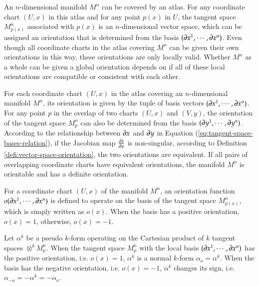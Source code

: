 \documentclass[11pt, a4paper]{book}
\begin{document}
An $n$-dimensional manifold $M^n$ can be covered by an atlas. For any coordinate chart
$(U,x)$ in this atlas and for any point $p(x)$ in $U$, the tangent space $M_{p(x)}^n$
associated with $p(x)$ is an $n$-dimensional vector space, which can be assigned an
orientation that is determined from the basis
$(\boldsymbol{\partial}x^1,\cdots,\boldsymbol{\partial}x^n)$. Even though all coordinate charts in the
atlas covering $M^n$ can be given their own orientations in this way, these orientations
are only locally valid. Whether $M^n$ as a whole can be given a global orientation depends
on if all of these local orientations are compatible or consistent with each other.

\begin{Definition}
  \label{defi:manifold-orientation}
  For each coordinate chart $(U,x)$ in the atlas covering an $n$-dimensional manifold
  $M^n$, its orientation is given by the tuple of basis vectors
  $(\boldsymbol{\partial}x^1,\cdots,\boldsymbol{\partial}x^n)$. For any point $p$ in the overlap of two
  charts $(U,x)$ and $(V,y)$, the orientation of the tangent space $M_p^n$ can also be
  determined from the basis $(\boldsymbol{\partial}y^1,\cdots,\boldsymbol{\partial}y^n)$. According to the
  relationship between $\boldsymbol{\partial}x$ and $\boldsymbol{\partial}y$ in Equation
  (\ref{eq:tangent-space-bases-relation}), if the Jacobian map $\frac{\partial x}{\partial y}$
  is non-singular, according to Definition \ref{defi:vector-space-orientation}, the two
  orientations are equivalent. If all pairs of overlapping coordinate charts have
  equivalent orientations, the manifold $M^n$ is orientable and has a definite
  orientation.
\end{Definition}

\begin{Definition}
  For a coordinate chart $(U,x)$ of the manifold $M^n$, an orientation function
  $o(\boldsymbol{\partial}x^1,\cdots,\boldsymbol{\partial}x^n)$ is defined to operate on the basis of the
  tangent space $M_{p(x)}^n$, which is simply written as $o(x)$. When the basis has a
  positive orientation, $o(x) = 1$, otherwise, $o(x) = -1$.
\end{Definition}

\begin{Definition}
  \label{defi:pseudo-form}
  Let $\alpha^k$ be a pseudo $k$-form operating on the Cartesian product of $k$ tangent
  spaces $\otimes^k M_p^n$. When the tangent space $M_p^n$ with the local basis
  $(\boldsymbol{\partial}x^1,\cdots,\boldsymbol{\partial}x^n)$ has the positive orientation, i.e.
  $o(x) = 1$, $\alpha^k$ is a normal $k$-form $\alpha_o = \alpha^k$. When the basis has
  the negative orientation, i.e. $o(x) = -1$, $\alpha^k$ changes its sign, i.e.
  $\alpha_{-o} = -\alpha^k = -\alpha_o$.
\end{Definition}
\end{document}
